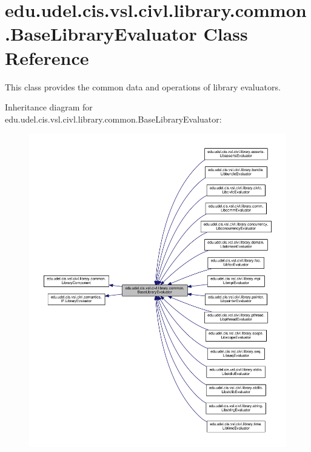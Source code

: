 \hypertarget{classedu_1_1udel_1_1cis_1_1vsl_1_1civl_1_1library_1_1common_1_1BaseLibraryEvaluator}{}\section{edu.\+udel.\+cis.\+vsl.\+civl.\+library.\+common.\+Base\+Library\+Evaluator Class Reference}
\label{classedu_1_1udel_1_1cis_1_1vsl_1_1civl_1_1library_1_1common_1_1BaseLibraryEvaluator}


This class provides the common data and operations of library evaluators.  




Inheritance diagram for edu.\+udel.\+cis.\+vsl.\+civl.\+library.\+common.\+Base\+Library\+Evaluator\+:
\nopagebreak
\begin{figure}[H]
\begin{center}
\leavevmode
\includegraphics[width=350pt]{classedu_1_1udel_1_1cis_1_1vsl_1_1civl_1_1library_1_1common_1_1BaseLibraryEvaluator__inherit__graph}
\end{center}
\end{figure}


